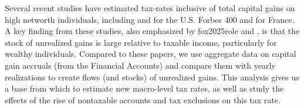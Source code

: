\documentclass[12pt]{article}
\begin{document}
Several recent studies have estimated tax-rates inclusive of total capital gains on high networth individuals, including \citet{yagan2023average} and \citet{balkir2025much} for the U.S. Forbes 400 and \citet{bach2025billionaires} for France. A key finding from these studies, also emphasized by {fox2025role} and \citet{msall2025never}, is that the stock of unrealized gains is large relative to taxable income, particularly for wealthy individuals. Compared to these papers, we use aggregate data on capital gain accruals (from the Financial Accounts) and compare them with yearly realizations to create flows (and stocks) of unrealized gains. This analysis gives us a base from which to estimate new macro-level tax rates, as well as study the effects of the rise of nontaxable accounts and tax exclusions on this tax rate. 

\end{document}
